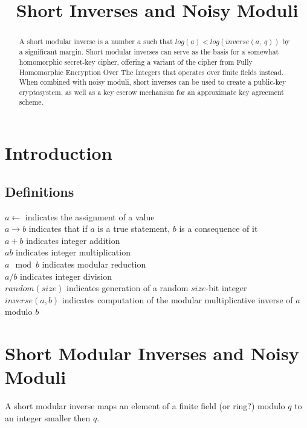 \documentclass[preprint]{iacrtrans}
\author{}
\institute{}
\title[Short Inverses and Noisy Moduli]{Short Inverses and Noisy Moduli}
\begin{document}
\maketitle


\begin{abstract}
 A short modular inverse is a number $a$ such that $log(a) < log(inverse(a,\ q))$ by a significant margin. Short modular inverses can serve as the basis for a somewhat homomorphic secret-key cipher, offering a variant of the cipher from Fully Homomorphic Encryption Over The Integers  that operates over finite fields instead. When combined with noisy moduli, short inverses can be used to create a public-key cryptosystem, as well as a key escrow mechanism for an approximate key agreement scheme. 
 \end{abstract}

\section{Introduction}
\todo{}

\subsection{Definitions}
$a \leftarrow$ indicates the assignment of a value\\
$a \rightarrow b$ indicates that if $a$ is a true statement, $b$ is a consequence of it\\
$a + b$ indicates integer addition\\
$a b$ indicates integer multiplication\\
$a \mod b$ indicates modular reduction\\
$a / b$ indicates integer division\\
$random(size)$ indicates generation of a random $size$-bit integer\\
$inverse(a, b)$ indicates computation of the modular multiplicative inverse of $a$ modulo $b$\\

\section{Short Modular Inverses and Noisy Moduli}
A short modular inverse maps an element of a finite field (or ring?) modulo $q$ to an integer smaller then $q$.
\end{document}
